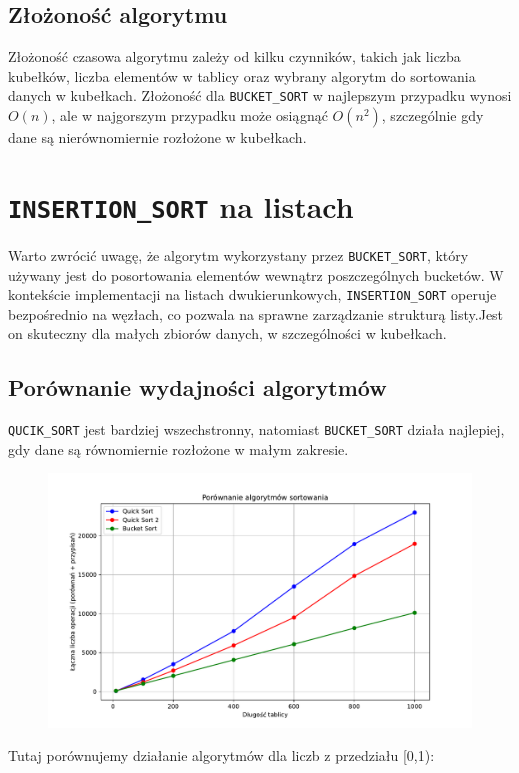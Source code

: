 \documentclass{article}
\begin{document}
\subsection{Złożoność algorytmu}
Złożoność czasowa algorytmu zależy od kilku czynników, takich jak liczba kubełków, liczba elementów w tablicy oraz wybrany algorytm do sortowania danych w kubełkach. Złożoność dla \texttt{BUCKET\_SORT} w najlepszym przypadku wynosi \(O(n)\), ale w najgorszym przypadku może osiągnąć \(O(n^2)\), szczególnie gdy dane są nierównomiernie rozłożone w kubełkach. 
	
\section{\texttt{INSERTION\_SORT} na listach}
Warto zwrócić uwagę, że algorytm wykorzystany przez \texttt{BUCKET\_SORT}, który używany jest do posortowania elementów wewnątrz poszczególnych bucketów. W kontekście implementacji na listach dwukierunkowych, \texttt{INSERTION\_SORT} operuje bezpośrednio na węzłach, co pozwala na sprawne zarządzanie strukturą listy.Jest on skuteczny dla małych zbiorów danych, w szczególności w kubełkach. 
	
\subsection{Porównanie wydajności algorytmów}
\texttt{QUCIK\_SORT} jest bardziej wszechstronny, natomiast \texttt{BUCKET\_SORT} działa najlepiej, gdy dane są równomiernie rozłożone w małym zakresie.

\begin{figure}[H]
	\centering
	\includegraphics[width=1\textwidth]{wykres1.pdf}
\end{figure}
 Tutaj porównujemy działanie algorytmów dla liczb z przedziału [0,1):
 
\end{document}
